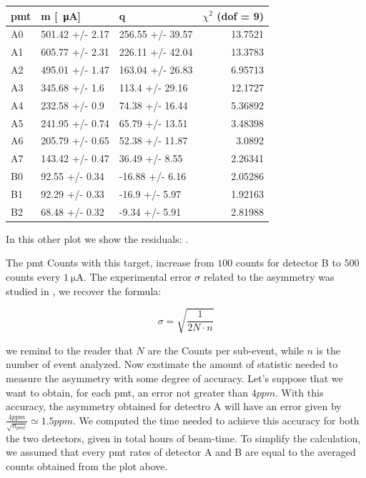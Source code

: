\begin{table}[ht]
\centering
\begin{tabular}{lllr}
\hline
 pmt   & m [\SI{}{\micro \ampere}]          & q                &  $\chi^{2}$ (dof = 9) \\
\hline
 A0    & 501.42 +/- 2.17 & 256.55 +/- 39.57 & 13.7521  \\
 A1    & 605.77 +/- 2.31 & 226.11 +/- 42.04 & 13.3783  \\
 A2    & 495.01 +/- 1.47 & 163.04 +/- 26.83 &  6.95713 \\
 A3    & 345.68 +/- 1.6  & 113.4 +/- 29.16  & 12.1727  \\
 A4    & 232.58 +/- 0.9  & 74.38 +/- 16.44  &  5.36892 \\
 A5    & 241.95 +/- 0.74 & 65.79 +/- 13.51  &  3.48398 \\
 A6    & 205.79 +/- 0.65 & 52.38 +/- 11.87  &  3.0892  \\
 A7    & 143.42 +/- 0.47 & 36.49 +/- 8.55   &  2.26341 \\
 B0    & 92.55 +/- 0.34  & -16.88 +/- 6.16  &  2.05286 \\
 B1    & 92.29 +/- 0.33  & -16.9 +/- 5.97   &  1.92163 \\
 B2    & 68.48 +/- 0.32  & -9.34 +/- 5.91   &  2.81988 \\
\hline
\end{tabular}
\end{table}

In this other plot we show the residuals: .

The pmt Counts with this target, increase from $100$ counts for detector B to $500$ counts every $\SI{1}{\micro \ampere}$.  The experimental error $\sigma$ related to the asymmetry was studied in , we recover the formula:

\begin{equation}
\sigma = \sqrt{\dfrac{1}{2 N \cdot n}}
\end{equation}

we remind to the reader that $N$ are the Counts per sub-event, while  $n$ is the number of event analyzed.
Now exstimate the amount of statistic needed to measure the asymmetry with some degree of accuracy. Let's suppose that we want to obtain, for each pmt, an error not greater than $4 ppm$. With this accuracy, the asymmetry obtained for detectro A will have an error given by $\frac{4ppm}{\sqrt{n_{pmt}}} \simeq 1.5 ppm$.
We computed the time needed to achieve this accuracy for both the two detectors, given in total hours of beam-time. To simplify the calculation, we assumed that every pmt rates of detector A and B are equal to the averaged counts obtained from the plot above.

